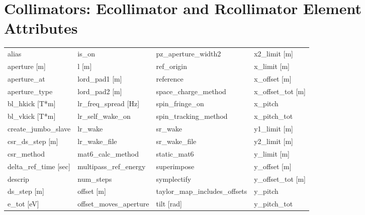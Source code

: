  \section{Collimators: Ecollimator and Rcollimator Element Attributes}
 \label{s:list.collimator}
 
 \begin{tabular}{llll} \toprule
alias                            & is_on                            & pz_aperture_width2               & x2_limit [m]                     \\
aperture [m]                     & l [m]                            & ref_origin                       & x_limit [m]                      \\
aperture_at                      & lord_pad1 [m]                    & reference                        & x_offset [m]                     \\
aperture_type                    & lord_pad2 [m]                    & space_charge_method              & x_offset_tot [m]                 \\
bl_hkick [T*m]                   & lr_freq_spread [Hz]              & spin_fringe_on                   & x_pitch                          \\
bl_vkick [T*m]                   & lr_self_wake_on                  & spin_tracking_method             & x_pitch_tot                      \\
create_jumbo_slave               & lr_wake                          & sr_wake                          & y1_limit [m]                     \\
csr_ds_step [m]                  & lr_wake_file                     & sr_wake_file                     & y2_limit [m]                     \\
csr_method                       & mat6_calc_method                 & static_mat6                      & y_limit [m]                      \\
delta_ref_time [sec]             & multipass_ref_energy             & superimpose                      & y_offset [m]                     \\
descrip                          & num_steps                        & symplectify                      & y_offset_tot [m]                 \\
ds_step [m]                      & offset [m]                       & taylor_map_includes_offsets      & y_pitch                          \\
e_tot [eV]                       & offset_moves_aperture            & tilt [rad]                       & y_pitch_tot                      \\

\end{tabular}
